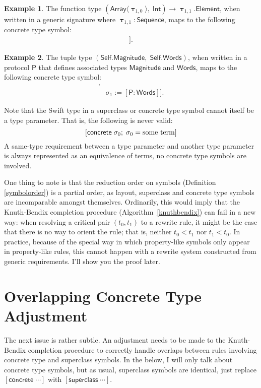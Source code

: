 \documentclass[a4paper,headsepline,bibliography=totoc,toc=flat,fleqn,twoside=semi]{scrbook}
\theoremstyle{definition}
\theoremstyle{definition}
\newtheorem{example}{Example}[chapter]
\theoremstyle{definition}
\newcommand{\namesym}[1]{\mathsf{#1}}
\newcommand{\genericparam}[1]{\bm{\mathsf{#1}}}
\newcommand{\proto}[1]{\bm{\mathsf{#1}}}
\newcommand{\genericsym}[2]{\bm{\uptau}_{#1,#2}}
\newcommand{\assocsym}[2]{[\proto{#1}\colon\namesym{#2}]}
\newcommand{\supersym}[1]{[\mathsf{superclass}\;#1]}
\newcommand{\concretesym}[1]{[\mathsf{concrete}\;#1]}
\begin{document}
\begin{example}
The function type $(\namesym{Array}\langle\genericsym{1}{0}\rangle,\; \namesym{Int})\rightarrow \genericsym{1}{1}.\namesym{Element}$, when written in a generic signature where $\genericsym{1}{1}\colon\proto{Sequence}$, maps to the following concrete type symbol:
\begin{align*}
\concretesym{&(\namesym{Array}\langle\sigma_0\rangle,\; \namesym{Int})\rightarrow \sigma_1;\\
&\sigma_0:=\genericsym{1}{0},\\
&\sigma_1:=\genericsym{1}{1}.\assocsym{Sequence}{Element}}.
\end{align*}
\end{example}
\begin{example}
The tuple type $(\genericparam{Self}.\namesym{Magnitude},\; \genericparam{Self}.\namesym{Words})$, when written in a protocol $\proto{P}$ that defines associated types $\namesym{Magnitude}$ and $\namesym{Words}$, maps to the following concrete type symbol:
\begin{align*}
\concretesym{&(\sigma_0,\;\sigma_1);\\
&\sigma_0:=\assocsym{P}{Magnitude},\\
&\sigma_1:=\assocsym{P}{Words}}.
\end{align*}
\end{example}
Note that the Swift type in a superclass or concrete type symbol cannot itself be a type parameter. That is, the following is never valid:
\[\concretesym{\sigma_0;\; \sigma_0=\hbox{some term}}\]
A same-type requirement between a type parameter and another type parameter is always represented as an equivalence of terms, no concrete type symbols are involved.

One thing to note is that the reduction order on symbols (Definition \ref{symbolorder}) is a partial order, as layout, superclass and concrete type symbols are incomparable amongst themselves. Ordinarily, this would imply that the Knuth-Bendix completion procedure (Algorithm~\ref{knuthbendix}) can fail in a new way: when resolving a critical pair $(t_0, t_1)$ to a rewrite rule, it might be the case that there is no way to orient the rule; that is, neither $t_0<t_1$ nor $t_1<t_0$. In practice, because of the special way in which property-like symbols only appear in property-like rules, this cannot happen with a rewrite system constructed from generic requirements. I'll show you the proof later.

\section{Overlapping Concrete Type Adjustment}\label{concretetypeadjust}
The next issue is rather subtle. An adjustment needs to be made to the Knuth-Bendix completion procedure to correctly handle overlaps between rules involving concrete type and superclass symbols. In the below, I will only talk about concrete type symbols, but as usual, superclass symbols are identical, just replace $\concretesym{\cdots}$ with $\supersym{\cdots}$.
\end{document}
